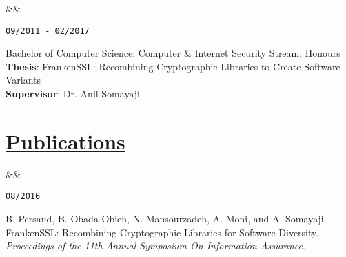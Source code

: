 \documentclass[11pt]{article} %
\newcommand{\heading}[1]{
    \section*{\uline{\hfill #1 }} %
}
\newcommand{\squish}{
\setlength{\itemsep}{0.2pt}
    \setlength{\parskip}{0pt} %
    \setlength{\parsep}{0.2pt}
}
\newcommand{\when}[1]{ %
    \hfill \texttt{#1}
}
\newcommand{\experience}[3]{ %
    \ifx&#2&
\item[{#1}]
    \else
\item[{#1}, \emph{#2}]
    \fi
    \when{#3}
}
\begin{document}
\begin{description}
        \squish
        \experience{Carleton University}
                   {}
                   {09/2011 - 02/2017}

            Bachelor of Computer Science: Computer \& Internet Security Stream,
            Honours \\
            \textbf{Thesis}: FrankenSSL: Recombining Cryptographic Libraries to
            Create Software Variants \\
            \textbf{Supervisor}: Dr. Anil Somayaji

\end{description}

\heading{Publications}%

\begin{description}
        \squish
        \experience{}
                   {}
                   {08/2016}

            B. Persaud, B. Obada-Obieh, N. Mansourzadeh, A. Moni, and A.
            Somayaji.  FrankenSSL: Recombining Cryptographic Libraries for
            Software Diversity.  \textit{Proceedings of the 11th Annual
            Symposium On Information Assurance}.
\end{description}
\end{document}

